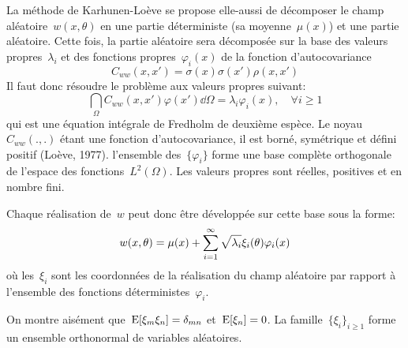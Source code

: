 La méthode de Karhunen-Loève se propose elle-aussi de décomposer le champ aléatoire~$w(x,\theta)$ en une partie déterministe (sa moyenne~$\mu(x)$) et une partie aléatoire.
Cette fois, la partie aléatoire sera décomposée sur la base des valeurs propres~$\lambda_i$ et des fonctions propres~$\varphi_i(x)$ de la fonction d'autocovariance
\begin{equation}
C_{ww}(x,x')=\sigma(x)\sigma(x')\rho(x,x')
\end{equation}
Il faut donc résoudre le problème aux valeurs propres suivant:
\begin{equation}
\dint_\Omega C_{ww}(x,x')\varphi(x')\dd \Omega = \lambda_i\varphi_i(x), \quad \forall i\ge 1
\end{equation}
qui est une équation intégrale de Fredholm de deuxième espèce.
Le noyau~$C_{ww}(.,.)$ étant une fonction d'autocovariance, il est borné, symétrique et défini positif (Loève, 1977). l'ensemble des~$\{\varphi_i\}$ forme une base complète orthogonale de l'espace des fonctions~$L^2(\Omega)$. Les valeurs propres sont réelles, positives et en nombre fini.

\medskip
Chaque réalisation de~$w$ peut donc être développée sur cette base sous la forme:
\begin{equation}\label{Eq-KL}
w(x,\theta) = \mu(x) + \displaystyle\sum_{i=1}^\infty \sqrt{\lambda_i}\xi_i(\theta)\varphi_i(x)
\end{equation}
où les~$\xi_i$ sont les coordonnées de la réalisation du champ aléatoire par rapport à l'ensemble des fonctions déterministes~$\varphi_i$.

On montre aisément que~$\operatorname{E}[\xi_m\xi_n]=\delta_{mn}$ et~$\operatorname{E}[\xi_n]=0$. La famille~$\{\xi_i\}_{i\ge1}$ forme un ensemble orthonormal de variables aléatoires.

